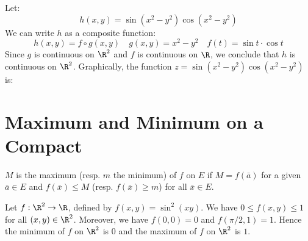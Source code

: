 \begin{eg}
    Let:
    \[
        h(x,y) = \sin (x^2 - y^2) \cos (x^2 - y^2)
    \]
    We can write $h$ as a composite function:
    \[
        h(x,y) = f \circ g (x,y) \quad g(x,y) = x^2 - y^2 \quad f(t) = \sin t \cdot \cos t
    \]
    Since $g$ is continuous on $\R^2$ and $f$ is continuous on $\R$, we conclude that $h$ is continuous on $\R^2$. Graphically, the function $z = \sin(x^2 - y^2) \cos (x^2 - y^2)$ is:
    \begin{center}
    \end{center}
\end{eg}

\section{Maximum and Minimum on a Compact}
\begin{definition}
    $M$ is the maximum (resp. $m$ the minimum) of $f$ on $E$ if $M = f(\bar{a})$ for a given $\bar{a} \in E$ and $f(\bar{x}) \leq M$ (resp. $f(\bar{x}) \geq m$) for all $\bar{x} \in E$.
\end{definition}

\begin{eg}
    Let $f: \R^2 \to \R$, defined by $f(x,y) = \sin^2(xy)$. We have $0 \leq f(x,y) \leq 1$ for all $(x,y) \in \R^2$. Moreover, we have $f(0,0) = 0$ and $f(\pi/2, 1) = 1$. Hence the minimum of $f$ on $\R^2$ is $0$ and the maximum of $f$ on $\R^2$ is $1$.
\end{eg}

